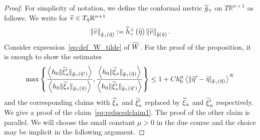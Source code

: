 \documentclass[AHL,Unicode,longabstracts,published]{cedram}
\newcommand{\bbR}{\mathbb{R}}
\let\oldtilde\tilde
\renewcommand*{\tilde}[1]{\mathchoice{\widetilde{#1}}{\widetilde{#1}}{\oldtilde{#1}}{\oldtilde{#1}}}
\newcommand{\bbR}{\mathbb{R}}
\begin{document}
\begin{proof}
For simplicity of notation, we define the conformal metric $\tilde{g}_{\gamma}$ on $T\bbR^{n+1}$ as follows. We write for $\tilde{v}\in T_{\tilde{\eta}}\bbR^{n+1}$
\begin{equation}\label{eq:def_gtilde}
\left\Vert \tilde{v}\right\Vert _{\tilde{g}_{\gamma}\left(\tilde{\eta}\right)}:=\tilde{h}_{\gamma}^{\perp}\left(\tilde{\eta}\right)\left\Vert \tilde{v}\right\Vert _{\tilde{g}\left(\tilde{\eta}\right)}.
\end{equation}
Consider expression~\eqref{eq:def_W_tilde} of $\tilde{W}$. For the proof of the proposition, it is enough to show the estimates
\begin{align}\label{eq:reducedclaim1}
\max\left\{ \frac{\left\langle h_{0}\|\tilde{\xi}'_{s}\|_{\tilde{g}_{\gamma}\left(\tilde{\eta}'\right)}\right\rangle}{\left\langle h_{0}\|\tilde{\xi}_{s}\|_{\tilde{g}_{\gamma}\left(\tilde{\eta}\right)}\right\rangle},\frac{\left\langle h_{0}\|\tilde{\xi}_{s}\|_{\tilde{g}_{\gamma}\left(\tilde{\eta}\right)}\right\rangle}{\left\langle h_{0}\|\tilde{\xi}'_{s}\|_{\tilde{g}_{\gamma}\left(\tilde{\eta}'\right)}\right\rangle}\right\} \le1+Ch_{0}^{\mu}\left\langle\|\tilde{\eta}'-\tilde{\eta}|_{\tilde{g}_{\gamma}\left(\tilde{\eta}\right)}\right\rangle^{N}
\end{align}
and the corresponding claims with $\tilde{\xi}_{s}$ and $\tilde{\xi}'_{s}$ replaced by $\tilde{\xi}_{u}$ and $\tilde{\xi}'_{u}$ respectively. We give a proof of the claim~\eqref{eq:reducedclaim1}. The proof of the other claim is parallel. We will choose the small constant $\mu>0$ in the due course and the choice may be implicit in the following argument.


\end{proof}
\end{document}
